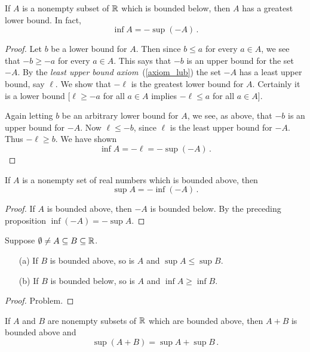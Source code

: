 \begin{prop} If $A$ is a nonempty subset of $\mathbb{R}$ which is bounded below, then $A$ has a greatest
lower bound. In fact,
  \[ \inf A  =  -\sup(-A)\,. \]
\end{prop}

\begin{proof}  Let $b$ be a lower bound for $A$. Then since $b \le a$ for every $a \in A$, we see
that $-b \ge -a$ for every $a \in A$. This says that $-b$ is an upper bound for the set  $-A$.
By the \emph{least upper bound axiom}~(\ref{axiom_lub}) the set $-A$ has a least upper bound,
say $\ell$. We show that $-\ell$ is the greatest lower bound for $A$. Certainly it is a lower
bound [$\ell \ge -a$ for all $a \in A$ implies $-\ell \le a$ for all $a \in A$].

Again letting $b$ be an arbitrary lower bound for $A$, we see, as above, that $-b$ is an upper
bound for $-A$.  Now $\ell \le -b$, since $\ell$ is the least upper bound for $-A$. Thus
$-\ell \ge b$. We have shown
  \[ \inf A = -\ell = -\sup(-A)\,. \]
\end{proof}

\begin{cor}  If $A$ is a nonempty set of real numbers which is bounded above, then
  \[ \sup A  = -\inf(-A)\,. \]
\end{cor}

\begin{proof} If $A$ is bounded above, then $-A$ is bounded below. By the preceding proposition
$\inf (-A) = -\sup A$.
\end{proof}

\begin{prop}  Suppose $\emptyset \ne A \subseteq B \subseteq \mathbb{R}$.
 \begin{enumerate}
  \item[(a)] If $B$ is bounded above, so is $A$ and $\sup A \le \sup B$.
  \item[(b)] If $B$ is bounded below, so is $A$ and $\inf A \ge \inf B$.
 \end{enumerate}
\end{prop}

\begin{proof} Problem.   \ns  \end{proof}

\begin{prop}  If $A$ and $B$ are nonempty subsets of $\mathbb{R}$ which are bounded above, then
$A + B$ is bounded above and
  \[ \sup (A + B) = \sup A + \sup B\,. \]
\end{prop}

